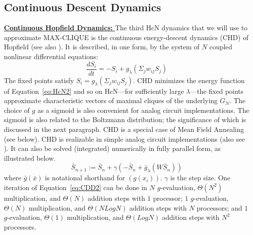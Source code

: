 \subsection*{Continuous Descent Dynamics}
\label{CDD}
{\underline{\bf Continuous Hopfield Dynamics: }}
The third HcN dynamics that we will use to approximate MAX-CLIQUE
is the continuous energy-descent dynamics (CHD) of Hopfield \cite{kn:Hop84} (see also
\cite{kn:HKP91}). 
It is
described, in one form, by the system of $N$ coupled nonlinear 
differential equations:
\begin{equation}
\frac{d S_i}{d t} = -S_i + g_{\lambda}(\Sigma_{j} w_{ij} S_j) \label{eq:CDD1}
\end{equation}
The fixed points satisfy $S_i = g_{\lambda}(\Sigma_{j} w_{ij} S_j)$.
CHD minimizes the energy function of Equation~\ref{eq:HcN2}
and so
on HcN---for sufficiently large $\lambda$---the fixed points approximate
characteristic vectors of maximal cliques of the underlying $G_N$.
The choice of $g$ as a sigmoid is also convenient for analog circuit 
implementations.
The sigmoid is also related to the Boltzmann distribution; the 
significance of which is discussed in the next paragraph. 
CHD is a special case of Mean Field Annealing (see below). CHD 
is realizable in
simple analog circuit implementations \cite{kn:Hop84} (also see \cite{kn:HKP91}).
It can also be solved (integrated) numerically in fully parallel 
form, as illustrated below.
\begin{equation}
\bar{S}_{n+1} := \bar{S}_{n} + \gamma (- \bar{S}_{n} + \bar{g}_{\lambda}(W \bar{S}_{n})) \label{eq:CDD2}
\end{equation}
where $\bar{g}(\bar{x})$ is notational shorthand for $(g(x_i))$.
$\gamma$ is the step size.
One iteration of Equation~\ref{eq:CDD2} can be done in 
$N$ $g$-evaluation, $\Theta(N^2)$ multiplication, and $\Theta(N)$ 
addition steps with $1$ processor;
$1$ $g$-evaluation, $\Theta(N)$ multiplication, and $\Theta(N Log N)$ 
addition steps with $N$ processors; and
$1$ $g$-evaluation, $\Theta(1)$ multiplication, and $\Theta(Log N)$ 
addition steps with $N^2$ processors. \newline
\vspace*{0.05in}
\newline
